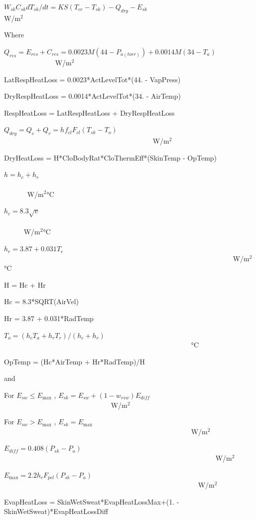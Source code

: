 \({W_{sk}}{C_{sk}}d{T_{sk}}/dt = KS({T_{cr}} - {T_{sk}}) - {Q_{dry}} - {E_{sk}}\) ~~~~~~~~~~~~~~~~~~~~~~~~~~~~~~ W/m\(^{2}\)

Where

\({Q_{res}} = {E_{res}} + {C_{res}} = 0.0023M(44 - {P_{a(torr)}}) + 0.0014M(34 - {T_a})\) ~~~~~~~~~~~~~~ W/m\(^{2}\)

LatRespHeatLoss = 0.0023*ActLevelTot*(44. - VapPress)

DryRespHeatLoss = 0.0014*ActLevelTot*(34. - AirTemp)

RespHeatLoss = LatRespHeatLoss + DryRespHeatLoss

\({Q_{dry}} = {Q_c} + {Q_r} = {h_{}}{f_{cl}}{F_{cl}}({T_{sk}} - {T_o})\) ~~~~~~~~~~~~~~~~~~~~~~~~~~~~~~~~~~~~~~~~~~ W/m\(^{2}\)

DryHeatLoss = H*CloBodyRat*CloThermEff*(SkinTemp - OpTemp)

\(h = {h_c} + {h_r}\) ~~~~~~~~~~~~~~~~~~~~~~~~~~~~~~~~~~~~~~~~~~~~~~~~~~~~~~~~~~~~~~~~~~~~~~~~~~~~~~ W/m\(^{2}\)°C

\({h_c} = 8.3\sqrt v\) ~~~~~~~~~~~~~~~~~~~~~~~~~~~~~~~~~~~~~~~~~~~~~~~~~~~~~~~~~~~~~~~~~~~~~~~~~~~~~ W/m\(^{2}\)°C

\({h_r} = 3.87 + 0.031{T_r}\) ~~~~~~~~~~~~~~~~~~~~~~~~~~~~~~~~~~~~~~~~~~~~~~~~~~~~~~~~~~~~~~~~~ W/m\(^{2}\)°C

H = Hc + Hr

Hc = 8.3*SQRT(AirVel)

Hr = 3.87 + 0.031*RadTemp

\({T_o} = ({h_c}{T_a} + {h_r}{T_r})/({h_c} + {h_r})\) ~~~~~~~~~~~~~~~~~~~~~~~~~~~~~~~~~~~~~~~~~~~~~~~~~~~~~ °C

OpTemp = (Hc*AirTemp + Hr*RadTemp)/H

and

For \({E_{sw}} \le {E_{\max }}\) , \({E_{sk}} = {E_{sw}} + (1 - {w_{rsw}}){E_{diff}}\) ~~~~~~~~~~~~~~~~~~~~~~~~~~~~~~ W/m\(^{2}\)

For \({E_{sw}} > {E_{\max }}\) , \({E_{sk}} = {E_{\max }}\) ~~~~~~~~~~~~~~~~~~~~~~~~~~~~~~~~~~~~~~~~~~~~~~~~~~~~~ W/m\(^{2}\)

\({E_{diff}} = 0.408({P_{sk}} - {P_a})\) ~~~~~~~~~~~~~~~~~~~~~~~~~~~~~~~~~~~~~~~~~~~~~~~~~~~~~~~~~~~~ W/m\(^{2}\)

\({E_{\max }} = 2.2{h_c}{F_{pcl}}({P_{sk}} - {P_a})\) ~~~~~~~~~~~~~~~~~~~~~~~~~~~~~~~~~~~~~~~~~~~~~~~~~~~~~~~ W/m\(^{2}\)

EvapHeatLoss = SkinWetSweat*EvapHeatLossMax+(1. - SkinWetSweat)*EvapHeatLossDiff

